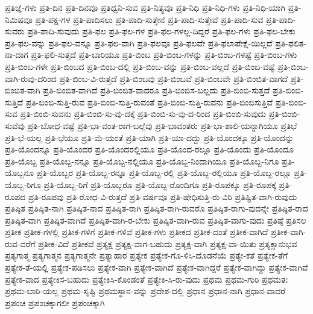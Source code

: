 {ಪ್ರತಿಜ್ಞೆ-ಗಳು
ಪ್ರತಿ-ದಿನ
ಪ್ರತಿ-ದಿನವೂ
ಪ್ರತಿಧ್ವನಿ-ಸುವ
ಪ್ರತಿ-ನಿತ್ಯವೂ
ಪ್ರತಿ-ನಿಧಿ
ಪ್ರತಿ-ನಿಧಿ-ಗಳು
ಪ್ರತಿ-ನಿಧಿ-ಯಾಗಿ
ಪ್ರತಿ-ನಿಮಿಷವೂ
ಪ್ರತಿ-ಪಕ್ಷ-ಗಳ
ಪ್ರತಿ-ಪಾದಿಸಲು
ಪ್ರತಿ-ಪಾದಿ-ಸುತ್ತೇನೆ
ಪ್ರತಿ-ಪಾದಿ-ಸುತ್ತೇವೆ
ಪ್ರತಿ-ಪಾದಿ-ಸುವ
ಪ್ರತಿ-ಪಾದಿ-ಸುವರು
ಪ್ರತಿ-ಪಾದಿ-ಸುವುದು
ಪ್ರತಿ-ಫಲ
ಪ್ರತಿ-ಫಲ-ಗಳ
ಪ್ರತಿ-ಫಲ-ಗಳಲ್ಲ-ದಿದ್ದರೆ
ಪ್ರತಿ-ಫಲ-ಗಳು
ಪ್ರತಿ-ಫಲ-ಬೇಕು
ಪ್ರತಿ-ಫಲ-ವನ್ನು
ಪ್ರತಿ-ಫಲ-ವನ್ನೂ
ಪ್ರತಿ-ಫಲ-ವಾಗಿ
ಪ್ರತಿ-ಫಲವೂ
ಪ್ರತಿ-ಫಲವೇ
ಪ್ರತಿ-ಫಲಾಪೇಕ್ಷೆ-ಯಿಲ್ಲದೆ
ಪ್ರತಿ-ಫಲಿತ-ನಾ-ದಾಗ
ಪ್ರತಿ-ಫಲಿ-ಸುತ್ತದೆ
ಪ್ರತಿ-ಬಾರಿಯೂ
ಪ್ರತಿ-ಬಿಂಬ
ಪ್ರತಿ-ಬಿಂಬ-ಗಳನ್ನು
ಪ್ರತಿ-ಬಿಂಬ-ಗಳಷ್ಟೆ
ಪ್ರತಿ-ಬಿಂಬ-ಗಳು
ಪ್ರತಿ-ಬಿಂಬ-ಗಳೇ
ಪ್ರತಿ-ಬಿಂಬದ
ಪ್ರತಿ-ಬಿಂಬ-ದಲ್ಲಿ
ಪ್ರತಿ-ಬಿಂಬ-ವನ್ನು
ಪ್ರತಿ-ಬಿಂಬ-ವಲ್ಲದೆ
ಪ್ರತಿ-ಬಿಂಬ-ವಷ್ಟೆ
ಪ್ರತಿ-ಬಿಂಬ-ವಾಗಿ-ರುವು-ದರಿಂದ
ಪ್ರತಿ-ಬಿಂಬ-ವಿ-ರುತ್ತದೆ
ಪ್ರತಿ-ಬಿಂಬವು
ಪ್ರತಿ-ಬಿಂಬವೆ
ಪ್ರತಿ-ಬಿಂಬವೇ
ಪ್ರತಿ-ಬಿಂಬಿತ-ವಾಗದೆ
ಪ್ರತಿ-ಬಿಂಬಿತ-ವಾಗಿ
ಪ್ರತಿ-ಬಿಂಬಿತ-ವಾಗಿದೆ
ಪ್ರತಿ-ಬಿಂಬಿತ-ವಾದರೂ
ಪ್ರತಿ-ಬಿಂಬಿಸ-ಬಲ್ಲದು
ಪ್ರತಿ-ಬಿಂಬಿ-ಸುತ್ತದೆ
ಪ್ರತಿ-ಬಿಂಬಿ-ಸುತ್ತಿದೆ
ಪ್ರತಿ-ಬಿಂಬಿ-ಸುತ್ತಿ-ರುವ
ಪ್ರತಿ-ಬಿಂಬಿ-ಸುತ್ತಿ-ರುವಂತೆ
ಪ್ರತಿ-ಬಿಂಬಿ-ಸುತ್ತಿ-ರುವನು
ಪ್ರತಿ-ಬಿಂಬಿಸುತ್ತಿವೆ
ಪ್ರತಿ-ಬಿಂಬಿ-ಸುವ
ಪ್ರತಿ-ಬಿಂಬಿ-ಸುವನು
ಪ್ರತಿ-ಬಿಂಬಿ-ಸು-ವು-ದಕ್ಕೆ
ಪ್ರತಿ-ಬಿಂಬಿ-ಸು-ವು-ದ-ರಿಂದ
ಪ್ರತಿ-ಬಿಂಬಿ-ಸುವುದು
ಪ್ರತಿ-ಬಿಂಬಿ-ಸುವೆವು
ಪ್ರತಿ-ಬೋಧ-ವಷ್ಟೆ
ಪ್ರತಿ-ಭಾ-ವಂತ-ರಾಗ-ಬಲ್ಲೆವು
ಪ್ರತಿ-ಭಾವಂತರು
ಪ್ರತಿ-ಭಾ-ಶಾಲಿ-ಯನ್ನಾಗಿಯೂ
ಪ್ರತಿಭೆ
ಪ್ರತಿ-ಭೆ-ಯಲ್ಲ
ಪ್ರತಿ-ಭೆಯೂ
ಪ್ರತಿ-ಮೆ-ಯಂತೆ
ಪ್ರತಿ-ಯಾಗಿ
ಪ್ರತಿ-ಯಾ-ದದ್ದು
ಪ್ರತಿ-ಯೊಂದಕ್ಕೂ
ಪ್ರತಿ-ಯೊಂದನ್ನು
ಪ್ರತಿ-ಯೊಂದನ್ನೂ
ಪ್ರತಿ-ಯೊಂದರ
ಪ್ರತಿ-ಯೊಂದರಲ್ಲಿಯೂ
ಪ್ರತಿ-ಯೊಂದ-ರಲ್ಲೂ
ಪ್ರತಿ-ಯೊಂದು
ಪ್ರತಿ-ಯೊಂದೂ
ಪ್ರತಿ-ಯೊಬ್ಬ
ಪ್ರತಿ-ಯೊಬ್ಬ-ನನ್ನೂ
ಪ್ರತಿ-ಯೊಬ್ಬ-ನಲ್ಲಿಯೂ
ಪ್ರತಿ-ಯೊಬ್ಬ-ನಿಂದಾಗಿಯೂ
ಪ್ರತಿ-ಯೊಬ್ಬ-ನಿಗೂ
ಪ್ರತಿ-ಯೊಬ್ಬನೂ
ಪ್ರತಿ-ಯೊಬ್ಬರ
ಪ್ರತಿ-ಯೊಬ್ಬ-ರನ್ನೂ
ಪ್ರತಿ-ಯೊಬ್ಬ-ರಲ್ಲಿ
ಪ್ರತಿ-ಯೊಬ್ಬ-ರಲ್ಲಿಯೂ
ಪ್ರತಿ-ಯೊಬ್ಬ-ರಲ್ಲೂ
ಪ್ರತಿ-ಯೊಬ್ಬ-ರಿಗೂ
ಪ್ರತಿ-ಯೊಬ್ಬ-ರಿಗೆ
ಪ್ರತಿ-ಯೊಬ್ಬರೂ
ಪ್ರತಿ-ಯೊಬ್ಬ-ರೊಂದಿಗೂ
ಪ್ರತಿ-ರೂಪಕ್ಕೂ
ಪ್ರತಿ-ರೂಪಕ್ಕೆ
ಪ್ರತಿ-ರೂಪದ
ಪ್ರತಿ-ರೂಪವು
ಪ್ರತಿ-ರೋಧ-ವಿ-ರುತ್ತದೆ
ಪ್ರತಿ-ವರ್ಷವೂ
ಪ್ರತಿ-ಷೇಧಿಸುತ್ತಿ-ರು-ವಿರಿ
ಪ್ರತಿಷ್ಟಿತ-ವಾಗಿ-ರುವುದು
ಪ್ರತಿಷ್ಠಿತ
ಪ್ರತಿಷ್ಠಿತ-ನಾಗಿ
ಪ್ರತಿಷ್ಠಿತ-ನಾದ
ಪ್ರತಿಷ್ಠಿತ-ರಾಗಿ
ಪ್ರತಿಷ್ಠಿತ-ರಾಗಿ-ರುವರೊ
ಪ್ರತಿಷ್ಠಿತ-ರಾಗು-ವುದನ್ನೇ
ಪ್ರತಿಷ್ಠಿತ-ರಾದ
ಪ್ರತಿಷ್ಠಿತ-ವಾಗಿ
ಪ್ರತಿಷ್ಠಿತ-ವಾಗಿದೆ
ಪ್ರತಿಷ್ಠಿತ-ವಾಗಿ-ರ-ಬೇಕು
ಪ್ರತಿಷ್ಠಿತ-ವಾಗಿ-ರುವ
ಪ್ರತಿಷ್ಠಿತ-ವಾಗು-ವುದು
ಪ್ರತಿಷ್ಠೆ
ಪ್ರತಿಸಲ
ಪ್ರತೀಕ
ಪ್ರತೀಕ-ಗಳಲ್ಲಿ
ಪ್ರತೀಕ-ಗಳಿಗೆ
ಪ್ರತೀಕ-ಗಳಿವೆ
ಪ್ರತೀಕ-ಗಳು
ಪ್ರತೀಕದ
ಪ್ರತೀಕ-ದಂತೆ
ಪ್ರತೀಕ-ವಾಗಿದೆ
ಪ್ರತೀಕ-ವಾಗಿ-ರುವ-ವರೆಗೆ
ಪ್ರತೀಕ-ವಿದೆ
ಪ್ರತೀಕವೆ
ಪ್ರತ್ಯಕ್ಷ
ಪ್ರತ್ಯಕ್ಷ-ವಾಗ-ಬಹುದು
ಪ್ರತ್ಯಕ್ಷ-ವಾಗಿ
ಪ್ರತ್ಯಕ್ಷ-ವಾ-ಯಿತು
ಪ್ರತ್ಯಕ್ಷಾನುಭವ
ಪ್ರತ್ಯಗಾತ್ಮ
ಪ್ರತ್ಯಗಾತ್ಮನ
ಪ್ರತ್ಯಗಾತ್ಮನೇ
ಪ್ರತ್ಯಾಹಾರ
ಪ್ರತ್ಯೇಕ
ಪ್ರತ್ಯೇಕ-ಗೊ-ಳಿಸಿ-ದೊಡನೆಯೆ
ಪ್ರತ್ಯೇ-ಕತೆ
ಪ್ರತ್ಯೇಕ-ತೆಗೆ
ಪ್ರತ್ಯೇಕ-ತೆ-ಯಲ್ಲಿ
ಪ್ರತ್ಯೇಕ-ಪಡಿಸಲು
ಪ್ರತ್ಯೇಕ-ವಾಗಿ
ಪ್ರತ್ಯೇಕ-ವಾಗಿದೆ
ಪ್ರತ್ಯೇಕ-ವಾಗಿದ್ದರೆ
ಪ್ರತ್ಯೇಕ-ವಾಗಿದ್ದು
ಪ್ರತ್ಯೇಕ-ವಾಗಿವೆ
ಪ್ರತ್ಯೇಕ-ವಾದ
ಪ್ರತ್ಯೇಕಿಸ-ಬಹುದು
ಪ್ರತ್ಯೇಕಿಸಿ-ಕೊಂಡಂತೆ
ಪ್ರತ್ಯೇಕಿ-ಸಿ-ರು-ವುದು
ಪ್ರಥಮ
ಪ್ರಥಮ-ಗುರಿ
ಪ್ರಥಮತಃ
ಪ್ರಥಮ-ಬಾರಿ-ಯಲ್ಲ
ಪ್ರಥಮ-ಸೃಷ್ಟಿ
ಪ್ರಥಮಸ್ಥಾನ-ವನ್ನು
ಪ್ರದೇಶ-ದಲ್ಲಿ
ಪ್ರಧಾನ
ಪ್ರಧಾನ-ನಾಗಿ
ಪ್ರಧಾನ-ವಾದರೆ
ಪ್ರಪಂಚ
ಪ್ರಪಂಚಕ್ಕಾಗಲೀ
ಪ್ರಪಂಚಕ್ಕಾಗಿ
}
